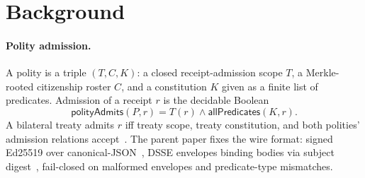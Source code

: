 \section{Background}
\label{sec:background}

\paragraph{Polity admission.}
A polity is a triple $(T, C, K)$: a closed receipt-admission scope $T$, a Merkle-rooted citizenship roster $C$, and a constitution $K$ given as a finite list of predicates. Admission of a receipt $r$ is the decidable Boolean
\[
  \mathsf{polityAdmits}(P, r) = T(r) \wedge \mathsf{allPredicates}(K, r).
\]
A bilateral treaty admits $r$ iff treaty scope, treaty constitution, and both polities' admission relations accept~. The parent paper fixes the wire format: signed Ed25519 over canonical-JSON~\cite{rfc8785}, DSSE envelopes binding bodies via subject digest~\cite{dsse}, fail-closed on malformed envelopes and predicate-type mismatches.


